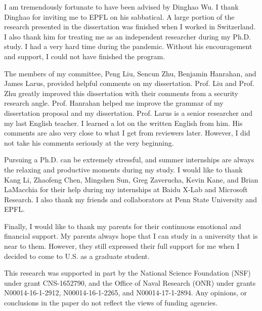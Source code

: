 I am tremendously fortunate to have been advised by Dinghao Wu.  I thank Dinghao for inviting me to EPFL on his sabbatical. A large portion of the research presented in the dissertation was finished when I worked in Switzerland. I also thank him for treating me as an independent researcher during my Ph.D. study. I had a very hard time during the pandemic. Without his encouragement and support, I could not have finished the program.

The members of my committee, Peng Liu, Sencun Zhu, Benjamin Hanrahan, and James Larus, provided helpful comments on my dissertation. Prof. Liu and Prof. Zhu greatly improved this dissertation with their comments from a security research angle. Prof. Hanrahan helped me improve the grammar of my dissertation proposal and my dissertation. Prof. Larus is a senior researcher and my last English teacher. I learned a lot on the written English from him.  His comments are also very close to what I get from reviewers later. However, I did not take his comments seriously at the very beginning.  

Pursuing a Ph.D. can be extremely stressful, and summer internships are always the relaxing and productive moments during my study. I would like to thank Kang Li, Zhaofeng Chen, Mingshen Sun, Greg Zaverucha, Kevin Kane, and Brian LaMacchia for their help during my internships at Baidu X-Lab and Microsoft Research.  I also thank my friends and collaborators at Penn State University and EPFL. 

Finally, I would like to thank my parents for their continuous emotional and financial support. My parents always hope that I can study in a university that is near to them. However, they still expressed their full support for me when I decided to come to U.S. as a graduate student.

This research was supported in part by the National Science Foundation (NSF) under grant CNS-1652790, and the Office of Naval Research (ONR) under grants N00014-16-1-2912, N00014-16-1-2265, and N00014-17-1-2894. Any opinions, or conclusions in the paper do not reflect the views of funding agencies.

